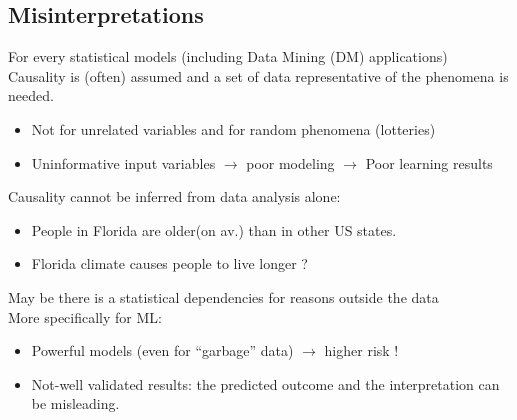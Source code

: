 \documentclass[../main.tex]{subfiles}
\begin{document}
\subsection{Misinterpretations}
For every statistical models (including Data Mining (DM) applications)\\

\noindent Causality is (often) assumed and a set of data representative of the phenomena is needed.
\begin{itemize}
    \item Not for unrelated variables and for random phenomena (lotteries)
    \item Uninformative input variables $\rightarrow$ poor modeling $\rightarrow$ Poor learning results
\end{itemize}


\noindent Causality cannot be inferred from data analysis alone:
\begin{itemize}
    \item People in Florida are older(on av.) than in other US states.
    \item Florida climate causes people to live longer ?
\end{itemize}


\noindent May be there is a statistical dependencies for reasons outside the data\\

\noindent More specifically for ML:
\begin{itemize}
    \item Powerful models (even for “garbage” data) $\rightarrow$ higher risk !
    \item Not-well validated results: the predicted outcome and the interpretation can be misleading.
\end{itemize}
\end{document}

